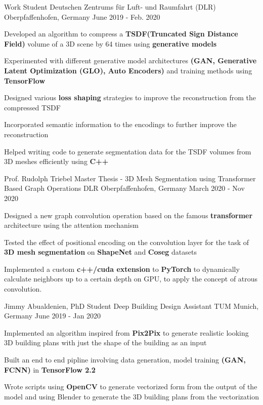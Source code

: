 \begin{cventries}
  \cventry
  {Work Student} %
  {Deutschen Zentrums für Luft- und Raumfahrt (DLR)} %
  {Oberpfaffenhofen, Germany} %
  {June 2019 - Feb. 2020} %
  {
  \begin{cvitems} %
    \item {Developed an algorithm to compress a \textbf{TSDF(Truncated Sign
    Distance Field)} volume of a 3D scene by 64 times using
    \textbf{generative models}}
    \item {Experimented with different generative model architectures
    \textbf{(GAN, Generative Latent Optimization (GLO), Auto Encoders)} and
    training methods using \textbf{TensorFlow}}
    \item {Designed various \textbf{loss shaping} strategies to improve the
    reconstruction from the compressed TSDF}
    \item {Incorporated semantic information to the encodings to further improve the reconstruction}
    \item {Helped writing code to generate segmentation data for the TSDF
    volumes from 3D meshes efficiently using \textbf{C++}}
  \end{cvitems}
  }
  \cventry
  {Prof. Rudolph Triebel} %
  {Master Thesis - 3D Mesh Segmentation using Transformer Based Graph Operations} %
  {DLR Oberpfaffenhofen, Germany} %
  {March 2020 - Nov 2020} %
  {
  \begin{cvitems} %
    \item {Designed a new graph convolution operation based on the famous
    \textbf{transformer} architecture using the attention mechanism}
    \item {Tested the effect of positional encoding on the convolution layer for
    the task of \textbf{3D mesh segmentation} on \textbf{ShapeNet} and \textbf{Coseg} datasets}
    \item {Implemented a custom \textbf{c++/cuda extension} to \textbf{PyTorch}
    to dynamically calculate neighbors up to a certain depth on GPU, to apply the
    concept of atrous convolution.}
  \end{cvitems}
  }
	\cventry
	{Jimmy Abualdenien, PhD Student} %
	{Deep Building Design Assistant} %
	{TUM Munich, Germany} %
	{June 2019 - Jan 2020} %
	{
		\begin{cvitems} %
			\item {Implemented an algorithm inspired from \textbf{Pix2Pix} to generate realistic looking 3D building plans with just the shape of the building as an input}
			\item {Built an end to end pipline involving data generation, model training \textbf{(GAN, FCNN)} in \textbf{TensorFlow 2.2}}
			\item {Wrote scripts using \textbf{OpenCV} to generate vectorized form from the output of the model and using Blender to generate the 3D building plans from the vectorization}
		\end{cvitems}
	}
\end{cventries}
